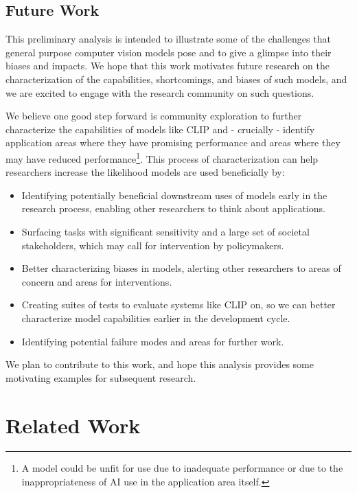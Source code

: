 \documentclass{article}
\begin{document}
\subsection{Future Work}
This preliminary analysis is intended to illustrate some of the challenges that general purpose computer vision models pose and to give a glimpse into their biases and impacts. We hope that this work motivates future research on the characterization of the capabilities, shortcomings, and biases of such models, and we are excited to engage with the research community on such questions. 

We believe one good step forward is community exploration to further characterize the capabilities of models like CLIP and - crucially - identify application areas where they have promising performance and areas where they may have reduced performance\footnote{A model could be unfit for use due to inadequate performance or due to the inappropriateness of AI use in the application area itself.}. This process of characterization can help researchers increase the likelihood models are used beneficially by:


\begin{itemize}
  \item Identifying potentially beneficial downstream uses of models early in the research process, enabling other researchers to think about applications.
  \item Surfacing tasks with significant sensitivity and a large set of societal stakeholders, which may call for intervention by policymakers.
  \item Better characterizing biases in models, alerting other researchers to areas of concern and areas for interventions.
  \item Creating suites of tests to evaluate systems like CLIP on, so we can better characterize model capabilities earlier in the development cycle.
  \item Identifying potential failure modes and areas for further work.
\end{itemize}


We plan to contribute to this work, and hope this analysis provides some motivating examples for subsequent research.

\section{Related Work}
\end{document}
